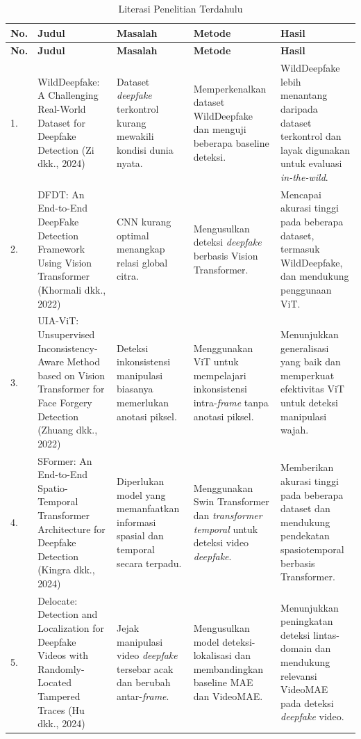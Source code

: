\begin{longtable}{|b{}|p{}|p{}|p{}|p{}|} %
	\caption{Literasi Penelitian Terdahulu}
	\label{table:2.literasi}\\
	\hline
	\textbf{No.} & \textbf{Judul} & \textbf{Masalah} & \textbf{Metode} & \textbf{Hasil} \\
	\hline
	\endfirsthead %
	\hline
	\textbf{No.} & \textbf{Judul} & \textbf{Masalah} & \textbf{Metode} & \textbf{Hasil} \\
	\hline
	\endhead %
	1. & WildDeepfake: A Challenging Real-World Dataset for Deepfake Detection (Zi dkk., 2024) & Dataset \textit{deepfake} terkontrol kurang mewakili kondisi dunia nyata. & Memperkenalkan dataset WildDeepfake dan menguji beberapa baseline deteksi. & WildDeepfake lebih menantang daripada dataset terkontrol dan layak digunakan untuk evaluasi \textit{in-the-wild}.\\
	\hline
	2. & DFDT: An End-to-End DeepFake Detection Framework Using Vision Transformer (Khormali dkk., 2022) & CNN kurang optimal menangkap relasi global citra. & Mengusulkan deteksi \textit{deepfake} berbasis Vision Transformer. & Mencapai akurasi tinggi pada beberapa dataset, termasuk WildDeepfake, dan mendukung penggunaan ViT.\\
	\hline
	3. & UIA-ViT: Unsupervised Inconsistency-Aware Method based on Vision Transformer for Face Forgery Detection (Zhuang dkk., 2022) & Deteksi inkonsistensi manipulasi biasanya memerlukan anotasi piksel. & Menggunakan ViT untuk mempelajari inkonsistensi intra-\textit{frame} tanpa anotasi piksel. & Menunjukkan generalisasi yang baik dan memperkuat efektivitas ViT untuk deteksi manipulasi wajah.\\
	\hline
	4. & SFormer: An End-to-End Spatio-Temporal Transformer Architecture for Deepfake Detection (Kingra dkk., 2024) & Diperlukan model yang memanfaatkan informasi spasial dan temporal secara terpadu. & Menggunakan Swin Transformer dan \textit{transformer temporal} untuk deteksi video \textit{deepfake}. & Memberikan akurasi tinggi pada beberapa dataset dan mendukung pendekatan spasiotemporal berbasis Transformer.\\
	\hline
	5. & Delocate: Detection and Localization for Deepfake Videos with Randomly-Located Tampered Traces (Hu dkk., 2024) & Jejak manipulasi video \textit{deepfake} tersebar acak dan berubah antar-\textit{frame}. & Mengusulkan model deteksi-lokalisasi dan membandingkan baseline MAE dan VideoMAE. & Menunjukkan peningkatan deteksi lintas-domain dan mendukung relevansi VideoMAE pada deteksi \textit{deepfake} video.\\
	\hline
\end{longtable}

